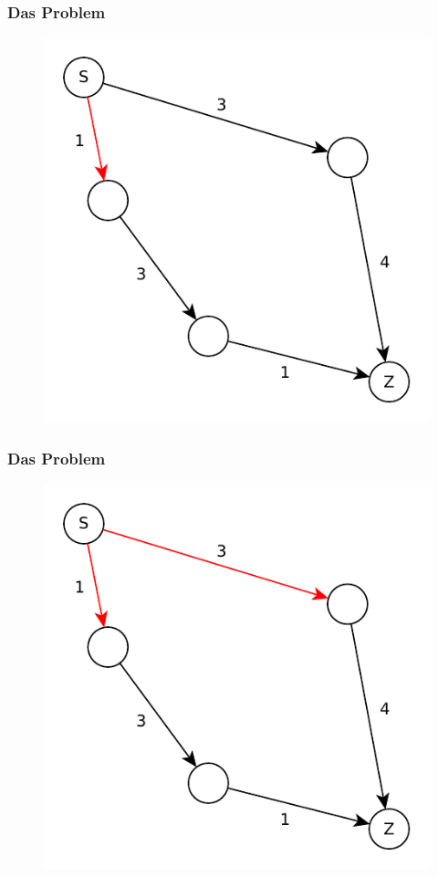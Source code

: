 \begin{frame}
\frametitle{Das Problem}
\begin{figure}
\includegraphics[scale=.8]{dijkstra_graphs/bfs_fail_1.pdf}
\end{figure}
\end{frame}

\begin{frame}
\frametitle{Das Problem}
\begin{figure}
\includegraphics[scale=.8]{dijkstra_graphs/bfs_fail_2.pdf}
\end{figure}
\end{frame}

